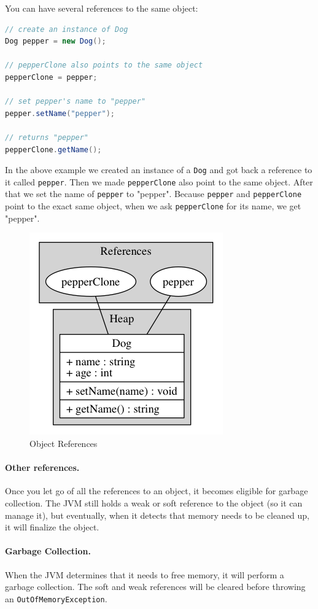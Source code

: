 \documentclass[fleqn,10pt]{SelfArx} %
\begin{document}
You can have several references to the same object:
\begin{lstlisting}[language=Java]
// create an instance of Dog
Dog pepper = new Dog();

// pepperClone also points to the same object
pepperClone = pepper;

// set pepper's name to "pepper"
pepper.setName("pepper");

// returns "pepper"
pepperClone.getName();

\end{lstlisting}
In the above example we created an instance of a \texttt{Dog} and got back a reference to it called \texttt{pepper}. Then we made \texttt{pepperClone} also point to the same object. After that we set the name of \texttt{pepper} to "pepper". Because \texttt{pepper} and \texttt{pepperClone} point to the exact same object, when we ask \texttt{pepperClone} for its name, we get "pepper".

\begin{figure}[H]\centering %
\includegraphics[width=0.5\linewidth]{object-reference}
\caption{Object References}
\label{fig:object-references}
\end{figure}
\paragraph{Other references.} Once you let go of all the references to an object, it becomes eligible for garbage collection. The JVM still holds a weak or soft reference to the object (so it can manage it), but eventually, when it detects that memory needs to be cleaned up, it will finalize the object.\cite{reference}

\paragraph{Garbage Collection.} When the JVM determines that it needs to free memory, it will perform a garbage collection. The soft and weak references will be cleared before throwing an \texttt{OutOfMemoryException}. 
\end{document}
